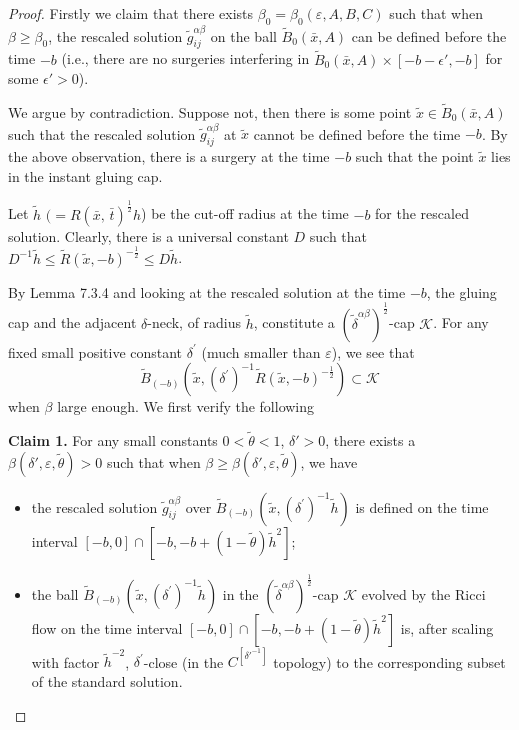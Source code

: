 \begin{proof}
Firstly we claim that
there exists $\beta_0=\beta_0( \varepsilon, A, B, C)$ such that
when $\beta\geq\beta_0$, the rescaled solution
$\widetilde{g}^{\alpha\beta}_{ij}$ on the ball
$\widetilde{B}_{0}(\bar{x},A)$ can be defined before the time $-b$
(i.e., there are no surgeries interfering in
$\widetilde{B}_{0}(\bar{x},A)\times [-b-\epsilon',-b]$ for some
$\epsilon'>0$).

We argue by contradiction. Suppose not, then there is some point
$\tilde{x}\in \widetilde{B}_{0}(\bar{x},A)$ such that the rescaled
solution $\widetilde{g}^{\alpha\beta}_{ij}$ at $\tilde{x}$ cannot
be defined before the time $-b$. By the above observation, there
is a surgery at the time $-b$ such that the point $\tilde{x}$ lies
in the instant gluing cap.

Let\; $\tilde{h}$\; $(=R(\bar{x},\,\bar{t})^{\frac{1}{2}}h$)\;
be\; the\; cut-off\; radius at the\; time\; $-b$\; for the
rescaled solution.  Clearly, there is a universal constant $D$
such that
${D}^{-1}\tilde{h}\leq\widetilde{R}(\tilde{x},-b)^{-\frac{1}{2}}\leq
D\tilde{h}$.

By Lemma 7.3.4 and looking at the rescaled solution at the time
$-b$, the gluing cap and the adjacent $\delta$-neck, of radius
$\tilde{h}$, constitute a
${(\widetilde{\delta}^{\alpha\beta})}^{\frac{1}{2}}$-cap
$\mathcal{K}$. For any fixed small positive constant
$\delta^{\prime}$ (much smaller than $\varepsilon$), we see that
$$
\widetilde{B}_{(-b)}(\tilde{x},{(\delta^{\prime})}^{-1}
\widetilde{R}(\tilde{x}, -b)^{-\frac{1}{2}})\subset\mathcal{K}
$$
when $\beta$ large enough.  We first verify the following

\medskip
{\bf Claim 1.} For any small constants $0<\tilde{\theta}<1$,
$\delta'>0$, there exists a $\beta(\delta',\varepsilon,
\tilde{\theta})> 0$ such that when $\beta \geq
\beta(\delta',\varepsilon, \tilde{\theta})$, we have
\begin{itemize}
\item[(i)] the rescaled solution
$\widetilde{g}^{\alpha\beta}_{ij}$ over
$\widetilde{B}_{(-b)}(\tilde{x},{(\delta^{\prime})}^{-1}
\tilde{h})$  is defined on the time interval
$[-b,0]\cap[-b,-b+(1-\tilde{\theta})\tilde{h}^{2}]$; \item[(ii)]
the ball
$\widetilde{B}_{(-b)}(\tilde{x},{(\delta^{\prime})}^{-1}\tilde{h})$
in the ${(\widetilde{\delta}^{\alpha\beta})}^{\frac{1}{2}}$-cap
$\mathcal{K}$ evolved by the Ricci flow  on the time interval
$[-b,0]\cap[-b,-b+(1-\tilde{\theta})\tilde{h}^{2}]$ is, after
scaling with factor $\tilde{h}^{-2}$, ${\delta}^{\prime}$-close
(in the $C^{[\delta'^{-1}]}$ topology) to the corresponding subset
of the standard solution.
\end{itemize}


\end{proof}
